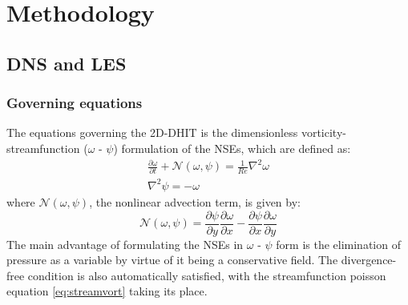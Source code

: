 \documentclass[conf]{new-aiaa}
\begin{document}
 
\section{Methodology}
\subsection{DNS and LES}
\subsubsection{Governing equations}
The equations governing the 2D-DHIT is the dimensionless vorticity-streamfunction ($\omega$ - $\psi$) formulation of the NSEs, which are defined as:
\begin{subequations}
    \label{NSEs}
    \begin{gather}
        \frac{\partial \omega}{\partial t} + \mathcal{N}(\omega,\psi)=\frac{1}{Re}\nabla^{2}\omega   \label{eq:vort}\\ 
        \nabla^{2}\psi=-\omega \label{eq:streamvort}
    \end{gather}
\end{subequations}
where $\mathcal{N}(\omega,\psi)$, the nonlinear advection term, is given by:
\begin{equation}
    \label{nonlinearphys}
    \mathcal{N}(\omega,\psi) = \frac{\partial \psi}{\partial y}\frac{\partial \omega}{\partial x}-\frac{\partial \psi}{\partial x}\frac{\partial \omega}{\partial y}
\end{equation}
The main advantage of formulating the NSEs in $\omega$ - $\psi$ form is the elimination of pressure as a variable by virtue of it being a conservative field. The divergence-free condition is also automatically satisfied, with the streamfunction poisson equation \eqref{eq:streamvort} taking its place. 
\end{document}
